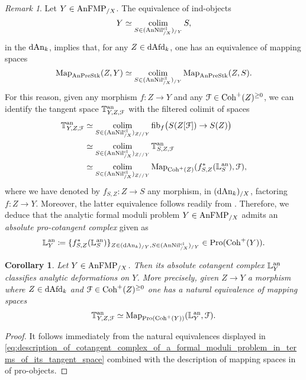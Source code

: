 \documentclass[10pt,a4paper,reqno]{amsart} %
\theoremstyle{plain}
\newtheorem{cor}[thm]{Corollary}
\theoremstyle{definition}
\theoremstyle{remark}
\newtheorem{rem}[thm]{Remark}
\numberwithin{equation}{section}
\begin{document}
\begin{rem} Let $Y \in \mathrm{AnFMP}_{/X}$.
    The equivalence of ind-objects
        \[
            Y \simeq \operatorname*{colim}_{S \in (\mathrm{AnNil}^{\mathrm{cl}}_{/X})_{/Y}} S,
        \]
    in the \infcat $\mathrm{dAn}_k$, implies that, for any $Z \in \mathrm{dAfd}_k$, one has an equivalence of mapping spaces
        \[
            \operatorname{Map}_{\mathrm{AnPreStk}}(Z, Y) \simeq \operatorname*{colim}_{S \in (\mathrm{AnNil}^{\mathrm{cl}}_{/X})_{/Y}}  \operatorname{Map}_{\mathrm{AnPreStk}}(Z,S ).
        \]
    For this reason, given any morphism $f \colon Z \to Y$ and any
    $\mathcal F \in \mathrm{Coh}^+(Z)^{\ge 0}$, we can identify the tangent space $\mathbb T^\mathrm{an}_{Y, Z, \mathcal F}$
    with the filtered colimit of spaces
        \begin{align} \label{eq:description_of_cotangent_complex_of_a_formal_moduli_problem_in_terms_of_its_tangent_space}
            \mathbb T^\mathrm{an}_{Y, Z, \mathcal F} & \simeq \operatorname*{colim}_{S \in (\mathrm{AnNil}^{\mathrm{cl}}_{/X})_{Z/ /Y}} \mathrm{fib}_f \big( S(Z[\mathcal F]) \to S(Z) \big) \\
                                & \simeq \operatorname*{colim}_{S \in (\mathrm{AnNil}^{\mathrm{cl}}_{/X})_{Z/ /Y}} \mathbb T^\mathrm{an}_{S, Z , \mathcal F } \\
                                & \simeq \operatorname*{colim}_{S \in (\mathrm{AnNil}^{\mathrm{cl}}_{/X})_{Z/ /Y}} \operatorname{Map}_{\mathrm{Coh}^+(Z)} (f_{S,Z}^* (\mathbb L^\mathrm{an}_S), \mathcal F),
        \end{align}
    where we have denoted by $f_{S, Z} \colon Z \to S$ any morphism, in $(\mathrm{dAn}_k)_{/X}$, factoring $f \colon Z \to Y$.
    Moreover, the latter equivalence follows readily from \cite[Lemma 7.7]{Porta_Yu_Representability}. Therefore, we deduce that
    the analytic formal moduli problem
    $Y \in \mathrm{AnFMP}_{/X}$ admits an \emph{absolute pro-cotangent complex} given as
        \[
           \mathbb L^\mathrm{an}_Y \coloneqq \{ f^*_{S,Z}( \mathbb L^\mathrm{an}_S )  \}_{Z \in (\mathrm{dAn}_k)_{/Y}, S \in (\mathrm{AnNil}^{\mathrm{cl}}_{/X})_{/Y}} \in \mathrm{Pro}(\mathrm{Coh}^+(Y)).
        \]
\end{rem}   

\begin{cor}
    Let $Y \in \mathrm{AnFMP}_{/X}$. Then its absolute cotangent complex $\mathbb L^\mathrm{an}_Y$ classifies analytic deformations on $Y$. More precisely, given $Z \to Y$ a morphism
    where $Z \in \mathrm{dAfd}_k$ and $\mathcal F \in \mathrm{Coh}^+(Z)^{\ge 0}$ one has a natural equivalence of mapping spaces
        \[
            \mathbb T^\mathrm{an}_{Y, Z, \mathcal F} \simeq \operatorname{Map}_{\mathrm{Pro}(\mathrm{Coh}^+(Y))}(\mathbb L^\mathrm{an}_Y, \mathcal F).  
        \]
\end{cor}

\begin{proof}
    It follows immediately from the natural equivalences displayed in \eqref{eq:description_of_cotangent_complex_of_a_formal_moduli_problem_in_terms_of_its_tangent_space}
    combined with the description of mapping spaces in \infcats of pro-objects.
\end{proof}
\end{document}
